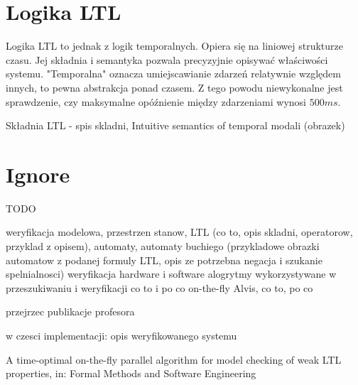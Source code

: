 \section{Logika LTL}

Logika LTL to jednak z logik temporalnych. Opiera się na liniowej strukturze czasu.
Jej składnia i semantyka pozwala precyzyjnie opisywać właściwości systemu.
"Temporalna" oznacza umiejscawianie zdarzeń relatywnie względem innych, to pewna abstrakcja ponad czasem.  Z tego powodu niewykonalne jest sprawdzenie, czy maksymalne opóźnienie między zdarzeniami wynosi $500ms$.

Składnia LTL
- spis skladni, Intuitive semantics of temporal modali (obrazek)


\section{Ignore}

TODO

weryfikacja modelowa, przestrzen stanow, LTL (co to, opis skladni, operatorow, przyklad z opisem), automaty, automaty buchiego (przykladowe obrazki automatow z podanej formuly LTL, opis ze potrzebna negacja i szukanie spelnialnosci)
weryfikacja hardware i software
alogrytmy wykorzystywane w przeszukiwaniu i weryfikacji
co to i po co on-the-fly
Alvis, co to, po co

\cite{Bar12} \cite{Jac05}
przejrzec publikacje profesora


w czesci implementacji:
opis weryfikowanego systemu


A time-optimal on-the-fly parallel algorithm for model checking of weak LTL properties, in: Formal Methods and Software Engineering

 
